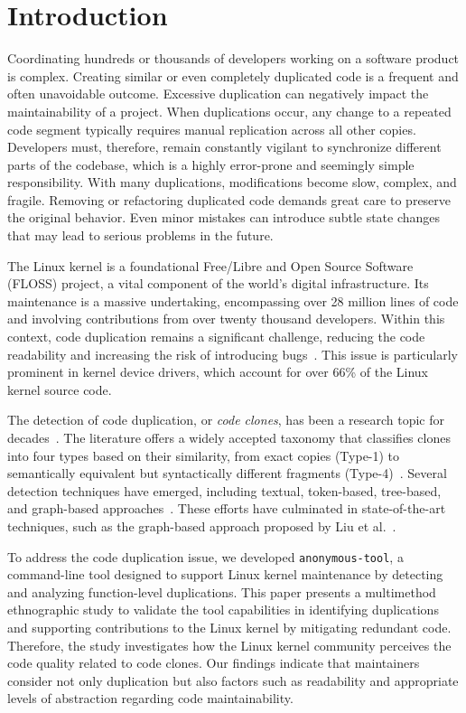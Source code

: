 \documentclass[10pt,conference]{IEEEtran}
\begin{document}

\IEEEpeerreviewmaketitle

\section{Introduction}
\label{sec:introduction}

Coordinating hundreds or thousands of developers working on a software product is complex. Creating similar or even completely duplicated code is a frequent and often unavoidable outcome. Excessive duplication can negatively impact the maintainability of a project. When duplications occur, any change to a repeated code segment typically requires manual replication across all other copies. Developers must, therefore, remain constantly vigilant to synchronize different parts of the codebase, which is a highly error-prone and seemingly simple responsibility. With many duplications, modifications become slow, complex, and fragile. Removing or refactoring duplicated code demands great care to preserve the original behavior. Even minor mistakes can introduce subtle state changes that may lead to serious problems in the future.

The Linux kernel is a foundational Free/Libre and Open Source Software (FLOSS) project, a vital component of the world's digital infrastructure. Its maintenance is a massive undertaking, encompassing over 28 million lines of code and involving contributions from over twenty thousand developers. Within this context, code duplication remains a significant challenge,  reducing the code readability and increasing the risk of introducing bugs~\cite{harmone,harmtwo}. This issue is particularly prominent in kernel device drivers, which account for over 66\% of the Linux kernel source code.

The detection of code duplication, or \textit{code clones}, has been a research topic for decades~\cite{firstman}. The literature offers a widely accepted taxonomy that classifies clones into four types based on their similarity, from exact copies (Type-1) to semantically equivalent but syntactically different fragments (Type-4)~\cite{litreview}. Several detection techniques have emerged, including textual, token-based, tree-based, and graph-based approaches~\cite{litreview}. These efforts have culminated in state-of-the-art techniques, such as the graph-based approach proposed by Liu et al.~\cite{tailor}.

To address the code duplication issue, we developed \texttt{anonymous-tool}, a command-line tool designed to support Linux kernel maintenance by detecting and analyzing function-level duplications. This paper presents a multimethod ethnographic study to validate the tool capabilities in identifying duplications and supporting contributions to the Linux kernel by mitigating redundant code. Therefore, the study investigates how the Linux kernel community perceives the code quality related to code clones. Our findings indicate that maintainers consider not only duplication but also factors such as readability and appropriate levels of abstraction regarding code maintainability.
\end{document}
